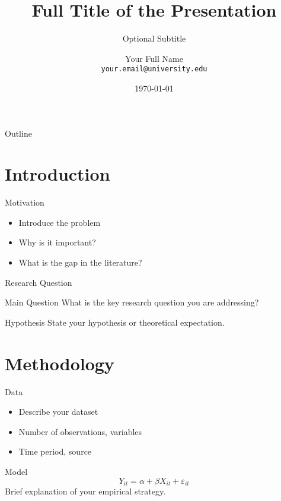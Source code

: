 \documentclass{beamer}
\title[Short Title]{Full Title of the Presentation}
\subtitle{Optional Subtitle}
\author[Your Name]{Your Full Name \\ \smallskip \texttt{your.email@university.edu}}
\institute[Your Univ.]{Department of X \\ Your University}
\date{\today} %
\begin{document}
\begin{frame}
  \titlepage
\end{frame}

\begin{frame}{Outline}
  \tableofcontents
\end{frame}

\section{Introduction}

\begin{frame}{Motivation}
  \begin{itemize}
    \item Introduce the problem
    \item Why is it important?
    \item What is the gap in the literature?
  \end{itemize}
\end{frame}

\begin{frame}{Research Question}
  \begin{block}{Main Question}
    What is the key research question you are addressing?
  \end{block}
  \pause
  \begin{exampleblock}{Hypothesis}
    State your hypothesis or theoretical expectation.
  \end{exampleblock}
\end{frame}

\section{Methodology}

\begin{frame}{Data}
  \begin{itemize}
    \item Describe your dataset
    \item Number of observations, variables
    \item Time period, source
  \end{itemize}
\end{frame}

\begin{frame}{Model}
  \begin{equation}
    Y_{it} = \alpha + \beta X_{it} + \varepsilon_{it}
  \end{equation}
  Brief explanation of your empirical strategy.
\end{frame}
\end{document}
